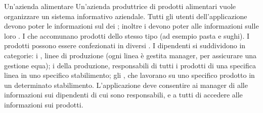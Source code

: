 \begin{esempio}{Un'azienda alimentare}
\small
Un'azienda produttrice di prodotti alimentari vuole organizzare un sistema informativo aziendale. Tutti gli utenti
dell'applicazione devono poter  le informazioni sul  dei ; inoltre i 
devono poter  alle informazioni sulle loro . I    che accomunano prodotti dello stesso tipo (ad esempio pasta e sughi). I prodotti possono essere confezionati in diversi
. I dipendenti si suddividono in categorie: i ,  linee di produzione (ogni
linea è gestita  manager, per assicurare una gestione equa); i  della produzione,
responsabili di tutti i prodotti di una specifica linea in uno specifico stabilimento; gli , che lavorano su uno
specifico prodotto in un determinato stabilimento. L'applicazione deve consentire ai manager di  alle informazioni
sui dipendenti di cui sono responsabili, e a tutti di accedere alle informazioni sui prodotti.
\normalsize


\end{esempio}
